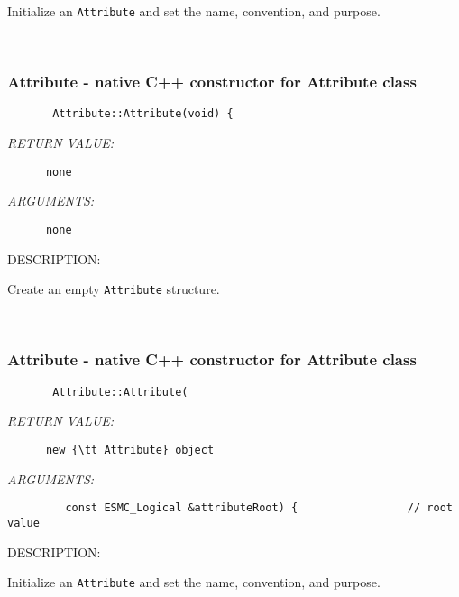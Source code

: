      Initialize an {\tt Attribute} and set the name, convention, and purpose.
   
 
\mbox{}\hrulefill\
 
\subsubsection [Attribute] {Attribute - native C++ constructor for Attribute class}


  
\begin{verbatim}       Attribute::Attribute(void) {\end{verbatim}{\em RETURN VALUE:}
\begin{verbatim}      none\end{verbatim}{\em ARGUMENTS:}
\begin{verbatim}      none\end{verbatim}
{\sf DESCRIPTION:\\ }


       Create an empty {\tt Attribute} structure.
   
 
\mbox{}\hrulefill\
 
\subsubsection [Attribute] {Attribute - native C++ constructor for Attribute class}


  
\begin{verbatim}       Attribute::Attribute(\end{verbatim}{\em RETURN VALUE:}
\begin{verbatim}      new {\tt Attribute} object\end{verbatim}{\em ARGUMENTS:}
\begin{verbatim}         const ESMC_Logical &attributeRoot) {                 // root value\end{verbatim}
{\sf DESCRIPTION:\\ }


     Initialize an {\tt Attribute} and set the name, convention, and purpose.
   
 
